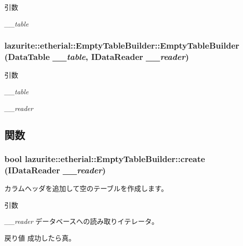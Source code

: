 \begin{DoxyParams}{引数}
\item[{\em \_\-\_\-table}]\end{DoxyParams}
\hypertarget{classlazurite_1_1etherial_1_1_empty_table_builder_ae3158d676e624b4162cbaa25eead4622}{
\subsubsection[{EmptyTableBuilder}]{\setlength{\rightskip}{0pt plus 5cm}lazurite::etherial::EmptyTableBuilder::EmptyTableBuilder (DataTable {\em \_\-\_\-table}, \/  IDataReader {\em \_\-\_\-reader})}}
\label{classlazurite_1_1etherial_1_1_empty_table_builder_ae3158d676e624b4162cbaa25eead4622}

\begin{DoxyParams}{引数}
\item[{\em \_\-\_\-table}]\item[{\em \_\-\_\-reader}]\end{DoxyParams}


\subsection{関数}
\hypertarget{classlazurite_1_1etherial_1_1_empty_table_builder_a7f64cba5d6702bc3fd43c81090fd185c}{
\subsubsection[{create}]{\setlength{\rightskip}{0pt plus 5cm}bool lazurite::etherial::EmptyTableBuilder::create (IDataReader {\em \_\-\_\-reader})}}
\label{classlazurite_1_1etherial_1_1_empty_table_builder_a7f64cba5d6702bc3fd43c81090fd185c}


カラムヘッダを追加して空のテーブルを作成します。 
\begin{DoxyParams}{引数}
\item[{\em \_\-\_\-reader}]データベースへの読み取りイテレータ。\end{DoxyParams}
\begin{DoxyReturn}{戻り値}
成功したら真。
\end{DoxyReturn}


